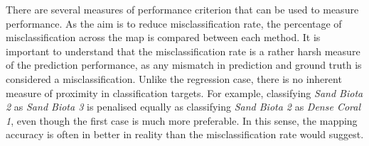 %			
			
			There are several measures of performance criterion that can be used to measure performance. As the aim is to reduce misclassification rate, the percentage of misclassification across the map is compared between each method. It is important to understand that the misclassification rate is a rather harsh measure of the prediction performance, as any mismatch in prediction and ground truth is considered a misclassification. Unlike the regression case, there is no inherent measure of proximity in classification targets. For example, classifying \textit{Sand Biota 2} as \textit{Sand Biota 3} is penalised equally as classifying \textit{Sand Biota 2} as \textit{Dense Coral 1}, even though the first case is much more preferable. In this sense, the mapping accuracy is often in better in reality than the misclassification rate would suggest.
			
